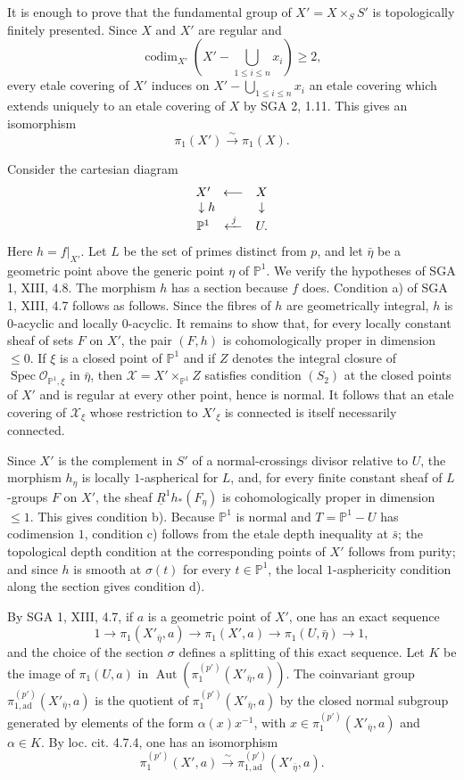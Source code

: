 \documentclass[11pt]{article}
\theoremstyle{plain}
\theoremstyle{definition}
\theoremstyle{remark}
\DeclareMathOperator{\Aut}{Aut}
\begin{document}
It is enough to prove that the fundamental group of $X'=X\times_S S'$ is topologically finitely presented. Since $X$ and $X'$ are regular and
\[
\operatorname{codim}_{X'}\left(X'-\bigcup_{1\le i\le n}x_i\right)\ge2,
\]
every etale covering of $X'$ induces on $X'-\bigcup_{1\le i\le n}x_i$ an etale covering which extends uniquely to an etale covering of $X$ by SGA 2, 1.11. This gives an isomorphism
\[
 \pi_1(X')\xrightarrow{\sim}\pi_1(X).
\]

Consider the cartesian diagram
\[
\begin{array}{ccc}
X'&\longleftarrow&X\\
\downarrow\rlap{$h$}&&\downarrow\\
\mathbb P^1&\xleftarrow{\;j\;}&U.
\end{array}
\]
Here $h=f|_{X'}$. Let $L$ be the set of primes distinct from $p$, and let $\bar\eta$ be a geometric point above the generic point $\eta$ of $\mathbb P^1$. We verify the hypotheses of SGA 1, XIII, 4.8. The morphism $h$ has a section because $f$ does. Condition a) of SGA 1, XIII, 4.7 follows as follows. Since the fibres of $h$ are geometrically integral, $h$ is $0$-acyclic and locally $0$-acyclic. It remains to show that, for every locally constant sheaf of sets $F$ on $X'$, the pair $(F,h)$ is cohomologically proper in dimension $\le0$. If $\xi$ is a closed point of $\mathbb P^1$ and if $Z$ denotes the integral closure of $\operatorname{Spec}\mathcal O_{\mathbb P^1,\xi}$ in $\bar\eta$, then $\mathcal X=X'\times_{\mathbb P^1}Z$ satisfies condition $(S_2)$ at the closed points of $X'$ and is regular at every other point, hence is normal. It follows that an etale covering of $\mathcal X_\xi$ whose restriction to $X'_\xi$ is connected is itself necessarily connected.

Since $X'$ is the complement in $S'$ of a normal-crossings divisor relative to $U$, the morphism $h_\eta$ is locally $1$-aspherical for $L$, and, for every finite constant sheaf of $L$-groups $F$ on $X'$, the sheaf $\underline{R}^1h_*(F_\eta)$ is cohomologically proper in dimension $\le1$. This gives condition b). Because $\mathbb P^1$ is normal and $T=\mathbb P^1-U$ has codimension $1$, condition c) follows from the etale depth inequality at $\bar s$; the topological depth condition at the corresponding points of $X'$ follows from purity; and since $h$ is smooth at $\sigma(t)$ for every $t\in\mathbb P^1$, the local $1$-asphericity condition along the section gives condition d).

By SGA 1, XIII, 4.7, if $a$ is a geometric point of $X'$, one has an exact sequence
\[
1\longrightarrow \pi_1(X'_{\bar\eta},a)\longrightarrow \pi_1(X',a)\longrightarrow \pi_1(U,\bar\eta)\longrightarrow1,
\]
and the choice of the section $\sigma$ defines a splitting of this exact sequence. Let $K$ be the image of $\pi_1(U,a)$ in $\Aut(\pi_1^{(p')}(X'_{\bar\eta},a))$. The coinvariant group $\pi_{1,\mathrm{ad}}^{(p')}(X'_{\bar\eta},a)$ is the quotient of $\pi_1^{(p')}(X'_{\bar\eta},a)$ by the closed normal subgroup generated by elements of the form $\alpha(x)x^{-1}$, with $x\in\pi_1^{(p')}(X'_{\bar\eta},a)$ and $\alpha\in K$. By loc. cit. 4.7.4, one has an isomorphism
\[
 \pi_1^{(p')}(X',a)\xrightarrow{\sim}\pi_{1,\mathrm{ad}}^{(p')}(X'_{\bar\eta},a).
\]
\end{document}
